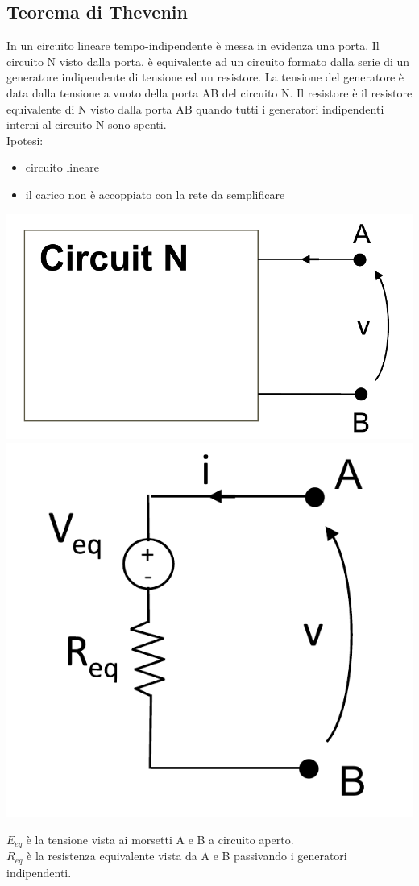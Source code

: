 \documentclass{article}
\begin{document}
\subsection{Teorema di Thevenin}
In un circuito lineare tempo-indipendente è messa in evidenza una porta. Il circuito N visto dalla porta, è equivalente ad un circuito formato dalla serie di un generatore indipendente di tensione ed un resistore. La tensione del generatore è data dalla tensione a vuoto
della porta AB del circuito N. Il resistore è il resistore equivalente di N visto dalla porta AB quando tutti i generatori indipendenti interni al circuito N sono spenti.
\vspace*{0.2cm}\\
Ipotesi:
\begin{itemize}
    \item circuito lineare
    \item il carico non è accoppiato con la rete da semplificare
\end{itemize}
\begin{center}
    \includegraphics[scale=0.3]{Image/Thevenin_1.png}
    \includegraphics[scale=0.3]{Image/Thevenin_2.png}
\end{center}
$E_{eq}$ è la tensione vista ai morsetti A e B a circuito aperto.\\
$R_{eq}$ è la resistenza equivalente vista da A e B passivando i generatori indipendenti.
\end{document}
